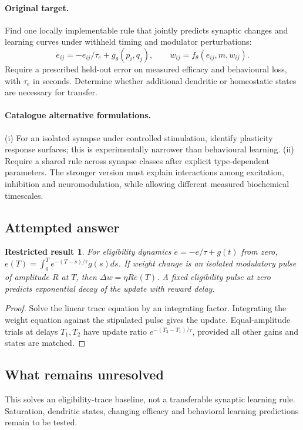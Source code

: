 \documentclass[11pt]{article}
\newtheorem{attemptresult}{Restricted result}[section]
\begin{document}
\paragraph{Original target.}
Find one locally implementable rule that jointly predicts synaptic changes and learning curves under withheld timing and modulator perturbations:
\[
\dot e_{ij}=-e_{ij}/\tau_e+g_\theta(p_i,q_j),\qquad
\dot w_{ij}=f_\theta(e_{ij},m,w_{ij}).
\]
Require a prescribed held-out error on measured efficacy and behavioural loss, with $\tau_e$ in seconds. Determine whether additional dendritic or homeostatic states are necessary for transfer.
\paragraph{Catalogue alternative formulations.}
(i) For an isolated synapse under controlled stimulation, identify plasticity response surfaces; this is experimentally narrower than behavioural learning. (ii) Require a shared rule across synapse classes after explicit type-dependent parameters. The stronger version must explain interactions among excitation, inhibition and neuromodulation, while allowing different measured biochemical timescales.
\subsection{Attempted answer}
\begin{attemptresult}
For eligibility dynamics $\dot e=-e/\tau+g(t)$ from zero, $e(T)=\int_0^Te^{-(T-s)/\tau}g(s)ds$. If weight change is an isolated modulatory pulse of amplitude $R$ at $T$, then $\Delta w=\eta R e(T)$. A fixed eligibility pulse at zero predicts exponential decay of the update with reward delay.
\end{attemptresult}
\begin{proof}
Solve the linear trace equation by an integrating factor. Integrating the weight equation against the stipulated pulse gives the update. Equal-amplitude trials at delays $T_1,T_2$ have update ratio $e^{-(T_2-T_1)/\tau}$, provided all other gains and states are matched.
\end{proof}
\subsection{What remains unresolved}
This solves an eligibility-trace baseline, not a transferable synaptic learning rule. Saturation, dendritic states, changing efficacy and behavioral learning predictions remain to be tested.
\end{document}

